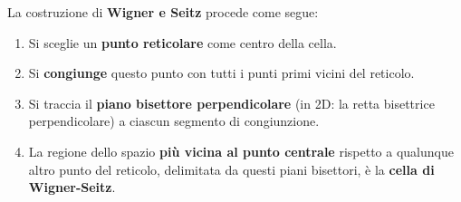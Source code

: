 La costruzione di \textbf{Wigner e Seitz} procede come segue:

\begin{enumerate}
    \item Si sceglie un \textbf{punto reticolare} come centro della cella.
    \item Si \textbf{congiunge} questo punto con tutti i punti primi vicini del reticolo.
    \item Si traccia il \textbf{piano bisettore perpendicolare} (in 2D: la retta bisettrice perpendicolare) a ciascun segmento di congiunzione.
    \item La regione dello spazio \textbf{più vicina al punto centrale} rispetto a qualunque altro punto del reticolo, delimitata da questi piani bisettori, è la \textbf{cella di Wigner-Seitz}.
\end{enumerate}

